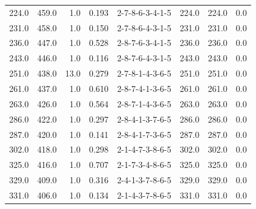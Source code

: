 \begin{tabular}{rrrrlrrr}
 224.0 &  459.0 &            1.0 &              0.193 &  2-7-8-6-3-4-1-5 &         224.0 &           224.0 &       0.0 \\
 231.0 &  458.0 &            1.0 &              0.150 &  2-7-8-6-4-3-1-5 &         231.0 &           231.0 &       0.0 \\
 236.0 &  447.0 &            1.0 &              0.528 &  2-8-7-6-3-4-1-5 &         236.0 &           236.0 &       0.0 \\
 243.0 &  446.0 &            1.0 &              0.116 &  2-8-7-6-4-3-1-5 &         243.0 &           243.0 &       0.0 \\
 251.0 &  438.0 &           13.0 &              0.279 &  2-7-8-1-4-3-6-5 &         251.0 &           251.0 &       0.0 \\
 261.0 &  437.0 &            1.0 &              0.610 &  2-8-7-4-1-3-6-5 &         261.0 &           261.0 &       0.0 \\
 263.0 &  426.0 &            1.0 &              0.564 &  2-8-7-1-4-3-6-5 &         263.0 &           263.0 &       0.0 \\
 286.0 &  422.0 &            1.0 &              0.297 &  2-8-4-1-3-7-6-5 &         286.0 &           286.0 &       0.0 \\
 287.0 &  420.0 &            1.0 &              0.141 &  2-8-4-1-7-3-6-5 &         287.0 &           287.0 &       0.0 \\
 302.0 &  418.0 &            1.0 &              0.298 &  2-1-4-7-3-8-6-5 &         302.0 &           302.0 &       0.0 \\
 325.0 &  416.0 &            1.0 &              0.707 &  2-1-7-3-4-8-6-5 &         325.0 &           325.0 &       0.0 \\
 329.0 &  409.0 &            1.0 &              0.316 &  2-4-1-3-7-8-6-5 &         329.0 &           329.0 &       0.0 \\
 331.0 &  406.0 &            1.0 &              0.134 &  2-1-4-3-7-8-6-5 &         331.0 &           331.0 &       0.0 \\
\bottomrule
\end{tabular}
